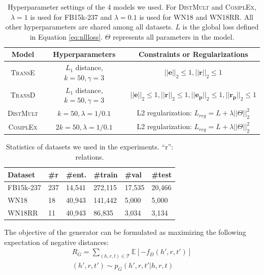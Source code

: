 \documentclass[11pt,a4paper]{article}
\begin{document}
\begin{table}[t]
\centering
\begin{tabular}{|c|c|c|}
\hline
\textbf{Model} & \textbf{Hyperparameters} & \textbf{Constraints or Regularizations}  \\ \hline
\textsc{TransE} & $L_1$ distance, $k=50, \gamma=3$ & $||\mathbf{e}||_2\leq 1,||\mathbf{r}||_2\leq 1$ \\ \hline
\textsc{TransD} & $L_1$ distance, $k=50, \gamma=3$ & $||\mathbf{e}||_2\leq 1,||\mathbf{r}||_2\leq 1,||\mathbf{e_p}||_2\leq 1,||\mathbf{r_p}||_2\leq 1$  \\ \hline
\textsc{DistMult} & $k=50, \lambda=1/0.1$ & L2 regularization: $L_{reg}=L+\lambda||\Theta||_2^2$ \\ \hline
\textsc{ComplEx}  & $2k=50, \lambda=1/0.1$ & L2 regularization: $L_{reg}=L+\lambda||\Theta||_2^2$ \\ \hline
\end{tabular}
\caption{Hyperparameter settings of the 4 models we used. For \textsc{DistMult} and \textsc{ComplEx}, $\lambda=1$ is used for FB15k-237 and $\lambda=0.1$ is used for WN18 and WN18RR. All other hyperparameters are shared among all datasets. $L$ is the global loss defined in Equation \eqref{eq:nllloss}. $\Theta$ represents all parameters in the model.}
\label{tab:hyperparams}
\end{table}

\begin{table}[t]
\small
\centering
\begin{tabular}{|l|l|l|l|l|l|}
\hline
\textbf{Dataset} & \textbf{\#r} & \textbf{\#ent.} & \textbf{\#train} & \textbf{\#val} & \textbf{\#test} \\ \hline
FB15k-237 & 237 & 14,541 & 272,115 & 17,535 & 20,466 \\ \hline
WN18 & 18 & 40,943 & 141,442 & 5,000 & 5,000 \\ \hline
WN18RR & 11 & 40,943 & 86,835 & 3,034 & 3,134 \\ \hline
\end{tabular}
\caption{Statistics of datasets we used in the experiments. ``r'': relations.}
\label{tab:datasets}
\end{table}

The objective of the generator can be formulated as maximizing the following expectation of negative distances:
\begin{multline}
R_G=\sum_{(h,r,t)\in\mathcal{T}}\mathbb{E}[-f_D(h',r,t')] \\
(h',r,t')\sim p_G(h',r,t'|h,r,t)
\end{multline}
\end{document}
